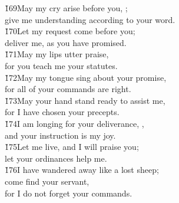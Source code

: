 \begin{poetry}
\poeml \v{169}May my cry arise before you, ; \\
\poemll    give me understanding according to your word. \\
\poeml \v{170}Let my request come before you; \\
\poemll    deliver me, as you have promised. \\
\poeml \v{171}May my lips utter praise, \\
\poemll    for you teach me your statutes. \\
\poeml \v{172}May my tongue sing about your promise, \\
\poemll    for all of your commands are right. \\
\poeml \v{173}May your hand stand ready to assist me, \\
\poemll    for I have chosen your precepts. \\
\poeml \v{174}I am longing for your deliverance, , \\
\poemll    and your instruction is my joy. \\
\poeml \v{175}Let me live, and I will praise you; \\
\poemll    let your ordinances help me. \\
\poeml \v{176}I have wandered away like a lost sheep; \\
\poemll    come find your servant, \\
\poemlll       for I do not forget your commands.
\end{poetry}

